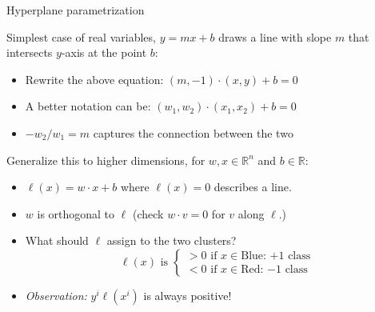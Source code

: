 \documentclass{beamer}
\begin{document}
\begin{frame}{Hyperplane parametrization}

Simplest case of real variables, $y = mx + b$ draws a line with slope $m$ that intersects $y$-axis at the point $b$:

\begin{itemize}
    \item Rewrite the above equation: $(m, -1) \cdot (x, y) + b = 0$
    \item A better notation can be: $(w_1, w_2) \cdot (x_1, x_2) + b = 0$ \item $-w_2/w_1 = m$ captures the connection between the two
\end{itemize}
\pause
Generalize this to higher dimensions, for $w, x \in \mathbb{R}^n$ and $b \in \mathbb{R}$:
\begin{itemize}
    \item $ \ell(x) = w\cdot x + b$ where $\ell(x) = 0$ describes a line.
    \item $w$ is orthogonal to $\ell$ (check $w\cdot v = 0$ for $v$ along $\ell$.)
    \item What should $\ell$ assign to the two clusters?
        \[
        \ell(x) \text{ is } 
        \begin{cases}
        > 0 \text{ if } x \in \text{Blue: $+1$ class} \\
        < 0 \text{ if } x \in \text{Red: $-1$ class}
        \end{cases}
        \]
    \item \textit{Observation:} $y^i\ell(x^i)$ is always positive!
\end{itemize}
    
\end{frame}

\end{document}
